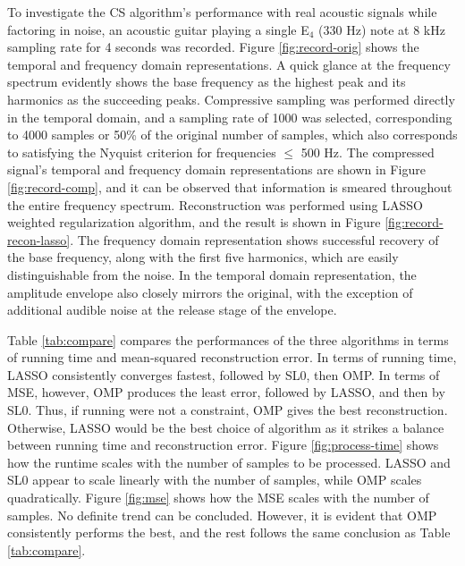 \documentclass[10pt,a4paper,twoside]{article}
\begin{document}
To investigate the CS algorithm's performance with real acoustic signals while factoring in noise, an acoustic guitar playing a single E$_4$ (330 Hz) note at 8 kHz sampling rate for 4 seconds was recorded. Figure \ref{fig:record-orig} shows the temporal and frequency domain representations. A quick glance at the frequency spectrum evidently shows the base frequency as the highest peak and its harmonics as the succeeding peaks. Compressive sampling was performed directly in the temporal domain, and a sampling rate of 1000 was selected, corresponding to 4000 samples or 50\% of the original number of samples, which also corresponds to satisfying the Nyquist criterion for frequencies $\leq$ 500 Hz. The compressed signal's temporal and frequency domain representations are shown in Figure \ref{fig:record-comp}, and it can be observed that information is smeared throughout the entire frequency spectrum. Reconstruction was performed using LASSO weighted regularization algorithm, and the result is shown in Figure \ref{fig:record-recon-lasso}. The frequency domain representation shows successful recovery of the base frequency, along with the first five harmonics, which are easily distinguishable from the noise. In the temporal domain representation, the amplitude envelope also closely mirrors the original, with the exception of additional audible noise at the release stage of the envelope.

Table \ref{tab:compare} compares the performances of the three algorithms in terms of running time and mean-squared reconstruction error. In terms of running time, LASSO consistently converges fastest, followed by SL0, then OMP. In terms of MSE, however, OMP produces the least error, followed by LASSO, and then by SL0. Thus, if running were not a constraint, OMP gives the best reconstruction. Otherwise, LASSO would be the best choice of algorithm as it strikes a balance between running time and reconstruction error. Figure \ref{fig:process-time} shows how the runtime scales with the number of samples to be processed. LASSO and SL0 appear to scale linearly with the number of samples, while OMP scales quadratically. Figure \ref{fig:mse} shows how the MSE scales with the number of samples. No definite trend can be concluded. However, it is evident that OMP consistently performs the best, and the rest follows the same conclusion as Table \ref{tab:compare}.

\end{document}
